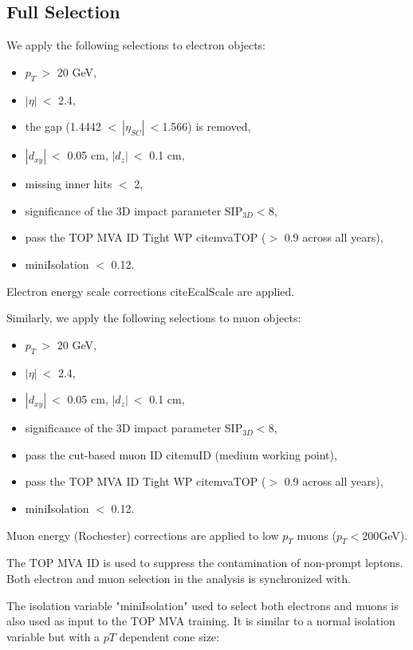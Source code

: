 \subsection{Full Selection}
We apply the following selections to electron objects:

\begin{itemize}
\item $p_{T}~>$ 20 GeV,
\item $|\eta|~<$ 2.4,
\item the gap (1.4442 $<~|\eta_{SC}|~<$1.566) is removed,
\item $|d_{xy}|~<$ 0.05 cm, $|d_{z}|~<$ 0.1 cm,
\item missing inner hits $<$ 2,
\item significance of the 3D impact parameter SIP$_{3D}<$8,
\item pass the TOP MVA ID Tight WP cite{mvaTOP} ($>$ 0.9 across all years),
\item miniIsolation $<$ 0.12.
\end{itemize}

Electron energy scale corrections cite{EcalScale} are applied.

Similarly, we apply the following selections to muon objects:

\begin{itemize}
\item $p_{T}~>$ 20 GeV,
\item $|\eta|~<$ 2.4,
\item $|d_{xy}|~<$ 0.05 cm, $|d_{z}|~<$ 0.1 cm,
\item significance of the 3D impact parameter SIP$_{3D}<$8,
\item pass the cut-based muon ID cite{muID} (medium working point),
\item pass the TOP MVA ID Tight WP cite{mvaTOP} ($>$ 0.9 across all years),
\item miniIsolation $<$ 0.12.
\end{itemize}

Muon energy (Rochester) corrections are applied to low $p_T$ muons ($p_T<$200GeV). 

The TOP MVA ID is used to suppress the contamination of non-prompt leptons. Both electron and muon selection in the analysis is synchronized with.

The isolation variable "miniIsolation" used to select both electrons and muons is also used as input to the TOP MVA training. It is similar to a normal isolation variable but with a $pT$ dependent cone size:

